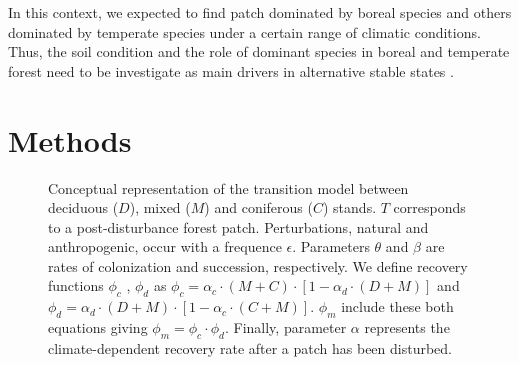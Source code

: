
In this context, we expected to find patch dominated by boreal species and
others dominated by temperate species under a certain range of climatic
conditions. Thus, the soil condition and the role of dominant species in
boreal and temperate forest need to be investigate as main drivers in
alternative stable states
\cite{Kellman2004,Moore2008,DeFrenne2013,Barras1998}.


\section{Methods}   

\begin{figure}
	
	\caption{Conceptual representation of the transition model between deciduous ($D$),
	mixed ($M$) and coniferous ($C$) stands. $T$ corresponds to a post-disturbance forest patch. Perturbations, natural and anthropogenic, occur with a frequence $\epsilon$. Parameters $\theta$ and $\beta$ are rates of colonization and succession,
	respectively. We define recovery functions $\phi_c$ , $\phi_d$ as $\phi_c
	= \alpha_c \cdot (M+C) \cdot [1- \alpha_d \cdot (D+M)]$ and $\phi_d =
	\alpha_d \cdot (D+M) \cdot [1- \alpha_c \cdot (C+M)]$. $\phi_m$ include these both equations giving $\phi_m = \phi_c \cdot \phi_d$. Finally, parameter $\alpha$ represents the climate-dependent recovery rate after a patch has been disturbed.}
	\label{Model}
	\vspace{-1em}
\end{figure}


